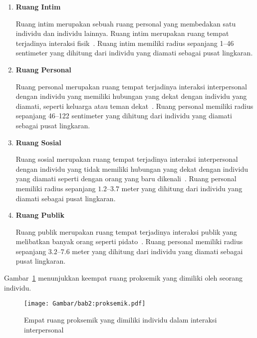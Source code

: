 \begin{enumerate}
    \item \textbf{Ruang Intim}
    
    Ruang intim merupakan sebuah ruang personal yang membedakan satu individu dan individu lainnya. Ruang intim merupakan ruang tempat terjadinya interaksi fisik~\cite{hall:06:proxemic}. Ruang intim memiliki radius sepanjang 1--46 sentimeter yang dihitung dari individu yang diamati sebagai pusat lingkaran. 
    
    \item \textbf{Ruang Personal}
    
    Ruang personal merupakan ruang tempat terjadinya interaksi interpersonal dengan individu yang memiliki hubungan yang dekat dengan individu yang diamati, seperti keluarga atau teman dekat~\cite{hall:06:proxemic}. Ruang personal memiliki radius sepanjang 46--122 sentimeter yang dihitung dari individu yang diamati  sebagai pusat lingkaran. 
    
    \item \textbf{Ruang Sosial}
    
    Ruang sosial merupakan ruang tempat terjadinya interaksi interpersonal dengan individu yang tidak memiliki hubungan yang dekat dengan individu yang diamati seperti dengan orang yang baru dikenali~\cite{hall:06:proxemic}. Ruang personal memiliki radius sepanjang $1.2$--$3.7$ meter yang dihitung dari individu yang diamati sebagai pusat lingkaran. 
    
    \item \textbf{Ruang Publik}
    
    Ruang publik merupakan ruang tempat terjadinya interaksi publik yang melibatkan banyak orang seperti pidato~\cite{hall:06:proxemic}. Ruang personal memiliki radius sepanjang $3.2$--$7.6$ meter yang dihitung dari individu yang diamati sebagai pusat lingkaran. 
\end{enumerate}

Gambar~\ref{bab2:proksemik} menunjukkan keempat ruang proksemik yang dimiliki oleh seorang individu.

\vspace{10pt}

\begin{figure}[h]
    \centering
    \texttt{[image: Gambar/bab2:proksemik.pdf]}
    \caption{Empat ruang proksemik yang dimiliki individu dalam interaksi interpersonal}
    \label{bab2:proksemik}
\end{figure}

